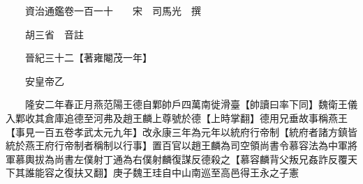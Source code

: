 










 


 
 


 

  
  
  
  
  





  
  
  
  
  
 
  

  

  
  
  



  

 
 

  
   




  

  
  


  　　資治通鑑卷一百一十　　宋　司馬光　撰

　　胡三省　音註

　　晉紀三十二【著雍閹茂一年】

　　安皇帝乙

　　隆安二年春正月燕范陽王德自鄴帥戶四萬南徙滑臺【帥讀曰率下同】魏衛王儀入鄴收其倉庫追德至河弗及趙王麟上尊號於德【上時掌翻】德用兄垂故事稱燕王【事見一百五卷孝武太元九年】改永康三年為元年以統府行帝制【統府者諸方鎮皆統於燕王府行帝制者稱制以行事】置百官以趙王麟為司空領尚書令慕容法為中軍將軍慕輿拔為尚書左僕射丁通為右僕射麟復謀反德殺之【慕容麟背父叛兄姦詐反覆天下其誰能容之復扶又翻】庚子魏王珪自中山南巡至高邑得王永之子憲


